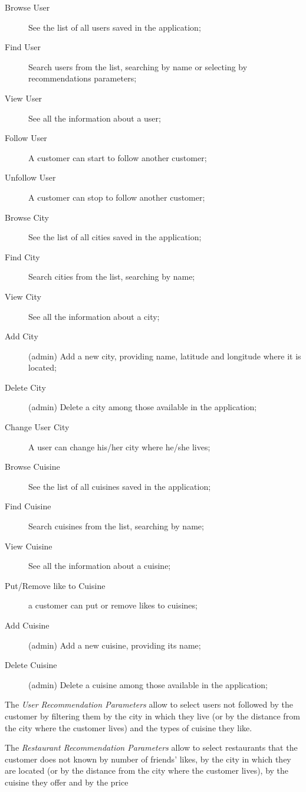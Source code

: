 \begin{description}
	\item[Browse User] See the list of all users saved in the application;
	\item[Find User] Search users from the list, searching by name or
		selecting by recommendations parameters;
	\item[View User] See all the information about a user;
	\item[Follow User] A customer can start to follow another customer;
	\item[Unfollow User] A customer can stop to follow another customer;
	\item[Browse City] See the list of all cities saved in the application;
	\item[Find City] Search cities from the list, searching by name;
	\item[View City] See all the information about a city;
	\item[Add City] (admin) Add a new city, providing name, latitude and
		longitude where it is located;
	\item[Delete City] (admin) Delete a city among those available in the
		application;
	\item[Change User City] A user can change his/her city where he/she
		lives;

	\item[Browse Cuisine] See the list of all cuisines saved in the
		application;
	\item[Find Cuisine] Search cuisines from the list, searching by name;
	\item[View Cuisine] See all the information about a cuisine;
	\item[Put/Remove like to Cuisine] a customer can put or remove likes to
		cuisines;
	\item[Add Cuisine] (admin) Add a new cuisine, providing its name;
	\item[Delete Cuisine] (admin) Delete a cuisine among those available in
		the application;
\end{description}

The \textit{User Recommendation Parameters} allow to select users not followed
by the customer by filtering them by the city in which they live (or by the
distance from the city where the customer lives) and the types of cuisine they
like.

The \textit{Restaurant Recommendation Parameters} allow to select restaurants
that the customer does not known by number of friends' likes, by the city in
which they are located (or by the distance from the city where the customer
lives), by the cuisine they offer and by the price
